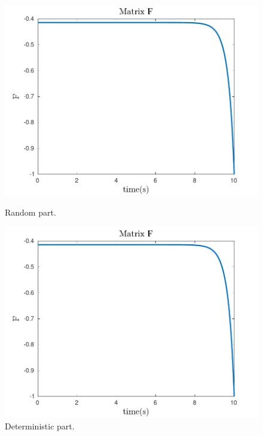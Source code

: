 \documentclass{article}
\begin{document}
\begin{figure}[H]
  \centering
  \begin{minipage}[b]{0.45\textwidth}
    \includegraphics[width=\textwidth]{fig2}
	\caption{Random part.}
  \end{minipage}
  \hfill
  \begin{minipage}[b]{0.45\textwidth}
    \includegraphics[width=\textwidth]{fig7}
	\caption{Deterministic part.}
  \end{minipage}
\end{figure}
\end{document}
